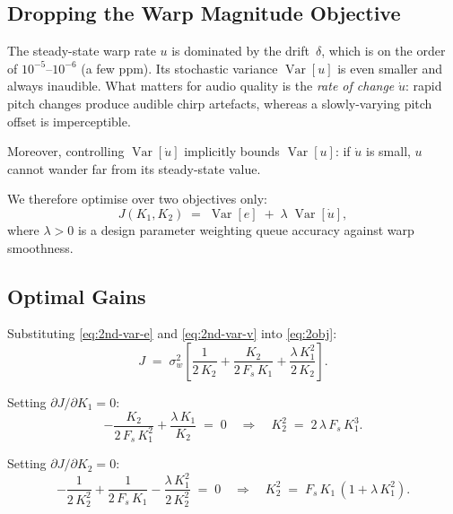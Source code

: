 \documentclass[11pt, a4paper]{article}
\theoremstyle{definition}
\theoremstyle{plain}
\theoremstyle{remark}
\newcommand{\Var}{\operatorname{Var}}
\begin{document}
\subsection{Dropping the Warp Magnitude Objective}\label{sec:drop-var-u}

The steady-state warp rate $u$ is dominated by the
drift~$\delta$, which is on the order of $10^{-5}$--$10^{-6}$
(a few ppm).  Its stochastic variance $\Var[u]$ is even smaller
and always inaudible.  What matters for audio quality is the
\emph{rate of change} $\dot{u}$: rapid pitch changes produce
audible chirp artefacts, whereas a slowly-varying pitch offset
is imperceptible.

Moreover, controlling $\Var[\dot{u}]$ implicitly bounds
$\Var[u]$: if $\dot{u}$ is small, $u$ cannot wander far from
its steady-state value.

We therefore optimise over two objectives only:
\begin{equation}\label{eq:2obj}
  J(K_1, K_2)
    \;=\; \Var[e] \;+\; \lambda\;\Var[\dot{u}],
\end{equation}
where $\lambda > 0$ is a design parameter weighting queue accuracy
against warp smoothness.

\subsection{Optimal Gains}\label{sec:optimal-gains}

Substituting \eqref{eq:2nd-var-e} and \eqref{eq:2nd-var-v} into
\eqref{eq:2obj}:
\begin{equation}\label{eq:J-expanded}
  J \;=\; \sigma_w^2\!\left[
    \frac{1}{2\,K_2}
    + \frac{K_2}{2\,F_s\,K_1}
    + \frac{\lambda\,K_1^2}{2\,K_2}
  \right].
\end{equation}

Setting $\partial J / \partial K_1 = 0$:
\begin{equation}\label{eq:opt-K1-cond}
  -\frac{K_2}{2\,F_s\,K_1^2} + \frac{\lambda\,K_1}{K_2} \;=\; 0
  \quad\Longrightarrow\quad
  K_2^2 \;=\; 2\,\lambda\,F_s\,K_1^3.
\end{equation}

Setting $\partial J / \partial K_2 = 0$:
\begin{equation}\label{eq:opt-K2-cond}
  -\frac{1}{2\,K_2^2} + \frac{1}{2\,F_s\,K_1}
  - \frac{\lambda\,K_1^2}{2\,K_2^2} \;=\; 0
  \quad\Longrightarrow\quad
  K_2^2 \;=\; F_s\,K_1\,(1 + \lambda\,K_1^2).
\end{equation}
\end{document}
